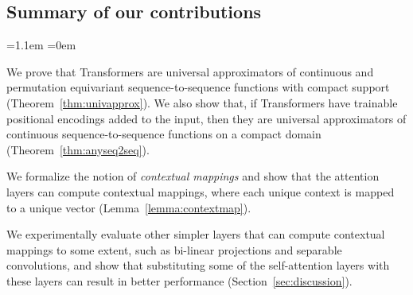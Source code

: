\documentclass{article} %
\begin{document}
\vspace*{-5pt}
\subsection{Summary of our contributions}
\vspace*{-5pt}
\begin{list}{\textbullet}{\leftmargin=1.1em \itemindent=0em \itemsep=1pt}
    \item We prove that Transformers are universal approximators of continuous and permutation equivariant sequence-to-sequence functions with compact support (Theorem~\ref{thm:univapprox}). We also show that, if Transformers have trainable positional encodings added to the input, then they are universal approximators of continuous sequence-to-sequence functions on a compact domain (Theorem~\ref{thm:anyseq2seq}). 
    \item We formalize the notion of \emph{contextual mappings} and show that the attention layers can compute contextual mappings, where each unique context is mapped to a unique vector (Lemma~\ref{lemma:contextmap}). 
    \item We experimentally evaluate other simpler layers that can compute contextual mappings to some extent, such as bi-linear projections and separable convolutions, and show that substituting some of the self-attention layers with these layers can result in better performance (Section~\ref{sec:discussion}). %
\end{list}

\vspace*{-5pt}
\end{document}
